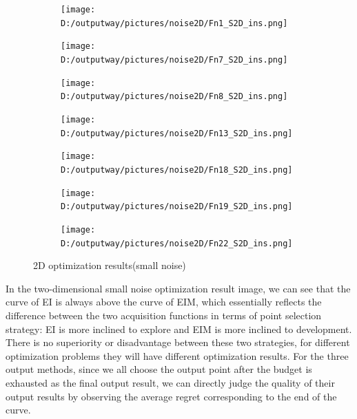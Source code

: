 \documentclass{article}
\begin{document}
\begin{figure}[H]
    \centering
    \begin{subfigure}[t]{.32\linewidth}
        \centering
        \texttt{[image: D:/outputway/pictures/noise2D/Fn1\_S2D\_ins.png]}
    \end{subfigure}
    \begin{subfigure}[t]{.32\linewidth}
        \centering
        \texttt{[image: D:/outputway/pictures/noise2D/Fn7\_S2D\_ins.png]}
    \end{subfigure}
    \begin{subfigure}[t]{.32\linewidth}
        \centering
        \texttt{[image: D:/outputway/pictures/noise2D/Fn8\_S2D\_ins.png]}
    \end{subfigure}
    \begin{subfigure}[t]{.32\linewidth}
        \centering
        \texttt{[image: D:/outputway/pictures/noise2D/Fn13\_S2D\_ins.png]}
    \end{subfigure}
    \begin{subfigure}[t]{.32\linewidth}
        \centering
        \texttt{[image: D:/outputway/pictures/noise2D/Fn18\_S2D\_ins.png]}
    \end{subfigure}
    \begin{subfigure}[t]{.32\linewidth}
        \centering
        \texttt{[image: D:/outputway/pictures/noise2D/Fn19\_S2D\_ins.png]}
    \end{subfigure}
    \begin{subfigure}[t]{.32\linewidth}
        \centering
        \texttt{[image: D:/outputway/pictures/noise2D/Fn22\_S2D\_ins.png]}
    \end{subfigure}
    \caption{2D optimization results(small noise)}
    \label{Fig2}
\end{figure}
In the two-dimensional small noise optimization result image, we can see that the curve of EI is always above the curve of EIM, which essentially reflects the difference between the two acquisition functions in terms of point selection strategy: EI is more inclined to explore and EIM is more inclined to development. There is no superiority or disadvantage between these two strategies, for different optimization problems they will have different optimization results. For the three output methods, since we all choose the output point after the budget is exhausted as the final output result, we can directly judge the quality of their output results by observing the average regret corresponding to the end of the curve.


\end{document}

